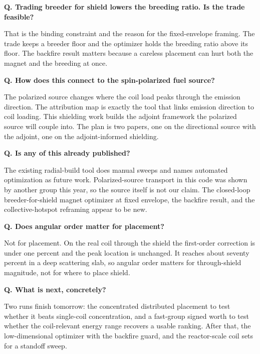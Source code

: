 \documentclass[11pt]{article}
\newcommand{\Q}[1]{\smallskip\noindent\textbf{Q. #1}\par}
\newcommand{\A}[1]{\noindent #1\par}
\begin{document}
\Q{Trading breeder for shield lowers the breeding ratio. Is the trade feasible?}
\A{That is the binding constraint and the reason for the fixed-envelope framing. The trade keeps a
breeder floor and the optimizer holds the breeding ratio above its floor. The backfire result matters
because a careless placement can hurt both the magnet and the breeding at once.}

\Q{How does this connect to the spin-polarized fuel source?}
\A{The polarized source changes where the coil load peaks through the emission direction. The
attribution map is exactly the tool that links emission direction to coil loading. This shielding
work builds the adjoint framework the polarized source will couple into. The plan is two papers, one
on the directional source with the adjoint, one on the adjoint-informed shielding.}

\Q{Is any of this already published?}
\A{The existing radial-build tool does manual sweeps and names automated optimization as future work.
Polarized-source transport in this code was shown by another group this year, so the source itself is
not our claim. The closed-loop breeder-for-shield magnet optimizer at fixed envelope, the backfire
result, and the collective-hotspot reframing appear to be new.}

\Q{Does angular order matter for placement?}
\A{Not for placement. On the real coil through the shield the first-order correction is under one
percent and the peak location is unchanged. It reaches about seventy percent in a deep scattering slab,
so angular order matters for through-shield magnitude, not for where to place shield.}

\Q{What is next, concretely?}
\A{Two runs finish tomorrow: the concentrated distributed placement to test whether it beats
single-coil concentration, and a fast-group signed worth to test whether the coil-relevant energy
range recovers a usable ranking. After that, the low-dimensional optimizer with the backfire guard,
and the reactor-scale coil sets for a standoff sweep.}
\end{document}
